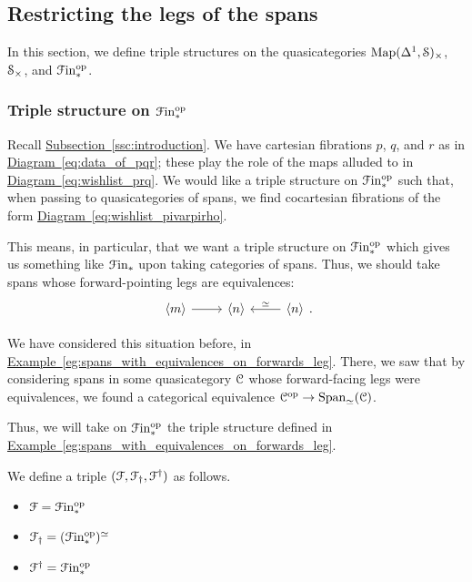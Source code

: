 \documentclass[main.tex]{subfiles}
\begin{document}
\subsection{Restricting the legs of the spans}
\label{ssc:restricting_the_legs_of_the_spans}

In this section, we define triple structures on the quasicategories $\Map(\Delta^{1}, \S)_{\times}$, $\S_{\times}$, and $\Finp\op$.

\subsubsection*{Triple structure on \texorpdfstring{$\Finp\op$}{Fin.op}}

Recall \hyperref[ssc:introduction]{Subsection~\ref*{ssc:introduction}}. We have cartesian fibrations $p$, $q$, and $r$ as in \hyperref[eq:data_of_pqr]{Diagram~\ref*{eq:data_of_pqr}}; these play the role of the maps alluded to in \hyperref[eq:wishlist_prq]{Diagram~\ref*{eq:wishlist_prq}}. We would like a triple structure on $\Finp\op$ such that, when passing to quasicategories of spans, we find cocartesian fibrations of the form \hyperref[eq:wishlist_pivarpirho]{Diagram~\ref*{eq:wishlist_pivarpirho}}.

This means, in particular, that we want a triple structure on $\Finp\op$ which gives us something like $\Finp$ upon taking categories of spans. Thus, we should take spans whose forward-pointing legs are equivalences:
\begin{equation*}
  \begin{tikzcd}
    \langle m \rangle
    \arrow[r]
    & \langle n \rangle
    & \langle n \rangle
    \arrow[l, swap, "\simeq"]
  \end{tikzcd}.
\end{equation*}

We have considered this situation before, in \hyperref[eg:spans_with_equivalences_on_forwards_leg]{Example~\ref*{eg:spans_with_equivalences_on_forwards_leg}}. There, we saw that by considering spans in some quasicategory $\category{C}$ whose forward-facing legs were equivalences, we found a categorical equivalence $\category{C}\op \to \Span_{\simeq}(\category{C})$.

Thus, we will take on $\Finp\op$ the triple structure defined in \hyperref[eg:spans_with_equivalences_on_forwards_leg]{Example~\ref*{eg:spans_with_equivalences_on_forwards_leg}}.

\begin{definition}
  We define a triple $\triple{F}$ as follows.
  \begin{itemize}
    \item $\mathcal{F} = \Finp\op$

    \item $\mathcal{F}\downdag = (\Finp\op)^{\simeq}$

    \item $\mathcal{F}\updag = \Finp\op$
  \end{itemize}
\end{definition}
\end{document}
